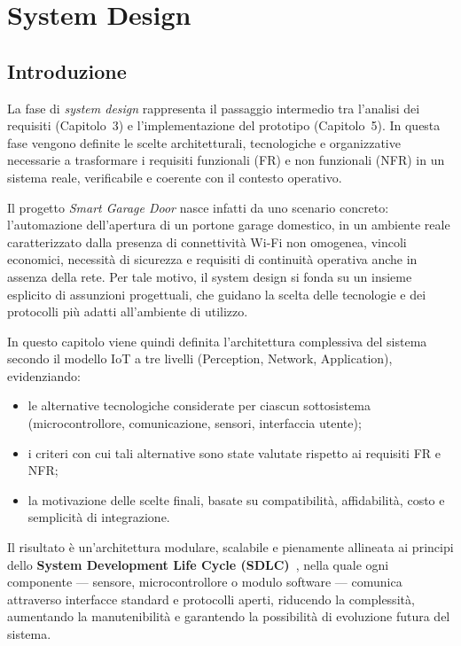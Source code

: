 \chapter{System Design}


\section{Introduzione}

La fase di \textit{system design} rappresenta il passaggio intermedio tra l’analisi dei requisiti (Capitolo~3) e l’implementazione del prototipo (Capitolo~5). In questa fase vengono definite le scelte architetturali, tecnologiche e organizzative necessarie a trasformare i requisiti funzionali (FR) e non funzionali (NFR) in un sistema reale, verificabile e coerente con il contesto operativo.

Il progetto \textit{Smart Garage Door} nasce infatti da uno scenario concreto: l’automazione dell’apertura di un portone garage domestico, in un ambiente reale caratterizzato dalla presenza di connettività Wi-Fi non omogenea, vincoli economici, necessità di sicurezza e requisiti di continuità operativa anche in assenza della rete. Per tale motivo, il system design si fonda su un insieme esplicito di assunzioni progettuali, che guidano la scelta delle tecnologie e dei protocolli più adatti all’ambiente di utilizzo.

In questo capitolo viene quindi definita l’architettura complessiva del sistema secondo il modello IoT a tre livelli (Perception, Network, Application), evidenziando:
\begin{itemize}
    \item le alternative tecnologiche considerate per ciascun sottosistema (microcontrollore, comunicazione, sensori, interfaccia utente);
    \item i criteri con cui tali alternative sono state valutate rispetto ai requisiti FR e NFR;
    \item la motivazione delle scelte finali, basate su compatibilità, affidabilità, costo e semplicità di integrazione.
\end{itemize}

Il risultato è un’architettura modulare, scalabile e pienamente allineata ai principi dello \textbf{System Development Life Cycle (SDLC)}~\cite{Pressman2019}, nella quale ogni componente — sensore, microcontrollore o modulo software — comunica attraverso interfacce standard e protocolli aperti, riducendo la complessità, aumentando la manutenibilità e garantendo la possibilità di evoluzione futura del sistema.


